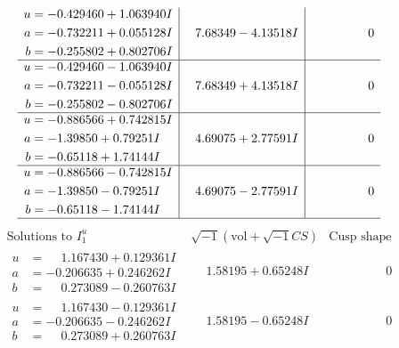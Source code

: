 \documentclass[1p]{elsarticle_modified}
\theoremstyle{definition}
\newcommand{\I}{\sqrt{-1}}
\begin{document}
$$\begin{array}{c|c|c}
\begin{aligned}
u &= -0.429460 + 1.063940 I \\
a &= -0.732211 + 0.055128 I \\
b &= -0.255802 + 0.802706 I\end{aligned}
 & \phantom{-}7.68349 - 4.13518 I & \phantom{-0.000000 } 0 \\ \hline\begin{aligned}
u &= -0.429460 - 1.063940 I \\
a &= -0.732211 - 0.055128 I \\
b &= -0.255802 - 0.802706 I\end{aligned}
 & \phantom{-}7.68349 + 4.13518 I & \phantom{-0.000000 } 0 \\ \hline\begin{aligned}
u &= -0.886566 + 0.742815 I \\
a &= -1.39850 + 0.79251 I \\
b &= -0.65118 + 1.74144 I\end{aligned}
 & \phantom{-}4.69075 + 2.77591 I & \phantom{-0.000000 } 0 \\ \hline\begin{aligned}
u &= -0.886566 - 0.742815 I \\
a &= -1.39850 - 0.79251 I \\
b &= -0.65118 - 1.74144 I\end{aligned}
 & \phantom{-}4.69075 - 2.77591 I & \phantom{-0.000000 } 0\\
 \hline 
 \end{array}$$\newpage$$\begin{array}{c|c|c}  
\text{Solutions to }I^u_{1}& \I (\text{vol} + \sqrt{-1}CS) & \text{Cusp shape}\\
 \hline 
\begin{aligned}
u &= \phantom{-}1.167430 + 0.129361 I \\
a &= -0.206635 + 0.246262 I \\
b &= \phantom{-}0.273089 - 0.260763 I\end{aligned}
 & \phantom{-}1.58195 + 0.65248 I & \phantom{-0.000000 } 0 \\ \hline\begin{aligned}
u &= \phantom{-}1.167430 - 0.129361 I \\
a &= -0.206635 - 0.246262 I \\
b &= \phantom{-}0.273089 + 0.260763 I\end{aligned}
 & \phantom{-}1.58195 - 0.65248 I & \phantom{-0.000000 } 0 \\ \hline\begin{aligned}

\end{aligned}
\end{array}$$
\end{document}

